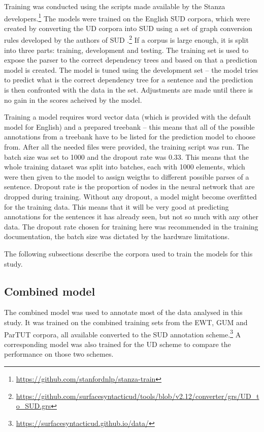 Training was conducted using the scripts made available by the Stanza developers.\footnote{\url{https://github.com/stanfordnlp/stanza-train}} The models were trained on the English SUD corpora, which were created by converting the UD corpora into SUD using a set of graph conversion rules developed by the authors of SUD \citep{gerdes-etal-2018-sud}.\footnote{\url{https://github.com/surfacesyntacticud/tools/blob/v2.12/converter/grs/UD_to_SUD.grs}} If a corpus is large enough, it is split into three parts: training, development and testing. The training set is used to expose the parser to the correct dependency trees and based on that a prediction model is created. The model is tuned using the development set -- the model tries to predict what is the correct dependency tree for a sentence and the prediction is then confronted with the data in the set. Adjustments are made until there is no gain in the scores acheived by the model. 

Training a model requires word vector data (which is provided with the default model for English) and a prepared treebank -- this means that all of the possible annotations from a treebank have to be listed for the prediction model to choose from. After all the needed files were provided, the training script was run. The batch size was set to 1000 and the dropout rate was 0.33. This means that the whole training dataset was split into batches, each with 1000 elements, which were then given to the model to assign weigths to different possible parses of a sentence. Dropout rate is the proportion of nodes in the neural network that are dropped during training. Without any dropout, a model might become overfitted for the training data. This means that it will be very good at predicting annotations for the sentences it has already seen, but not so much with any other data. The dropout rate chosen for training here was recommended in the training documentation, the batch size was dictated by the hardware limitations.

The following subsections describe the corpora used to train the models for this study.

\subsection{Combined model}
The combined model was used to annotate most of the data analysed in this study. It was trained on the combined training sets from the EWT, GUM and ParTUT corpora, all available converted to the SUD annotation scheme.\footnote{\url{https://surfacesyntacticud.github.io/data/}} A corresponding model was also trained for the UD scheme to compare the performance on those two schemes.

